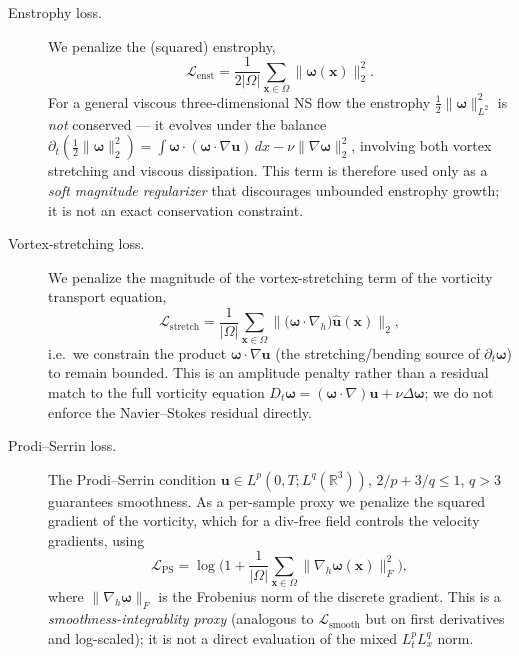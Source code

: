 \documentclass[review]{elsarticle}
\begin{document}
\begin{description}
\item[Enstrophy loss.] We penalize the (squared) enstrophy,
\begin{equation}
\mathcal{L}_{\text{enst}}
= \frac{1}{2|\Omega|}\sum_{\bm{x}\in\Omega}\|\bm{\omega}(\bm{x})\|_2^2 .
\label{eq:enst}
\end{equation}
For a general viscous three-dimensional NS flow the enstrophy $\frac12\|\bm{\omega}\|_{L^2}^2$
is \emph{not} conserved --- it evolves under the balance
$\partial_t(\frac12\|\bm{\omega}\|_2^2) = \int \bm{\omega}\!\cdot\!(\bm{\omega}\!\cdot\!\nabla\bm{u})\,dx - \nu\|\nabla\bm{\omega}\|_2^2$,
involving both vortex stretching and viscous dissipation. This term is therefore used only as a
\emph{soft magnitude regularizer} that discourages unbounded enstrophy growth; it is not an
exact conservation constraint.

\item[Vortex-stretching loss.] We penalize the magnitude of the vortex-stretching term of the
vorticity transport equation,
\begin{equation}
\mathcal{L}_{\text{stretch}}
= \frac{1}{|\Omega|}\sum_{\bm{x}\in\Omega}
\big\| \big(\bm{\omega}\cdot\nabla_h\big)\hat{\bm{u}}(\bm{x}) \big\|_2,
\label{eq:stretch}
\end{equation}
i.e.\ we constrain the product $\bm{\omega}\cdot\nabla\bm{u}$ (the stretching/bending source of
$\partial_t\bm{\omega}$) to remain bounded. This is an amplitude penalty rather than a residual
match to the full vorticity equation $D_t\bm{\omega}=(\bm{\omega}\cdot\nabla)\bm{u}+\nu\Delta\bm\omega$;
we do not enforce the Navier--Stokes residual directly.

\item[Prodi--Serrin loss.] The Prodi--Serrin condition
$\bm{u}\in L^p(0,T;L^q(\mathbb{R}^3))$, $2/p+3/q\le 1$, $q>3$ guarantees smoothness. As a
per-sample proxy we penalize the squared gradient of the vorticity, which for a div-free field
controls the velocity gradients, using
\begin{equation}
\mathcal{L}_{\text{PS}}
= \log\!\Big(1 + \frac{1}{|\Omega|}\sum_{\bm{x}\in\Omega}\|\nabla_h\bm{\omega}(\bm{x})\|_F^2\Big),
\label{eq:ps}
\end{equation}
where $\|\nabla_h\bm{\omega}\|_F$ is the Frobenius norm of the discrete gradient. This is a
\emph{smoothness-integrablity proxy} (analogous to $\mathcal{L}_{\text{smooth}}$ but on first
derivatives and log-scaled); it is not a direct evaluation of the mixed $L^p_tL^q_x$ norm.
\end{description}
\end{document}
